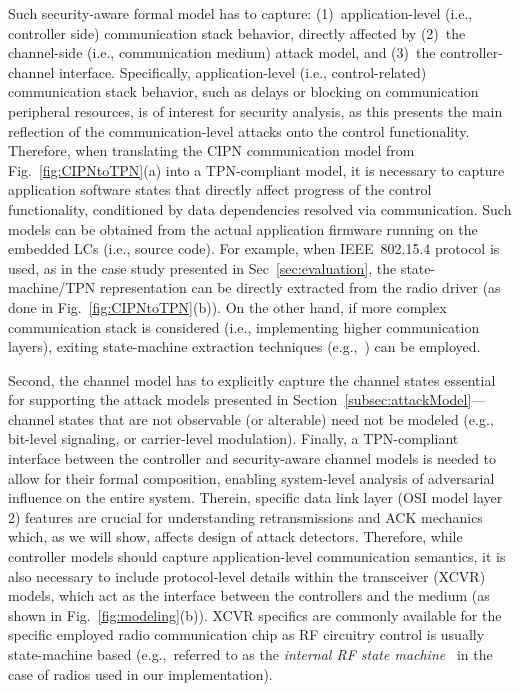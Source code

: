 {
Such security-aware formal model has to capture:
(1)~application-level (i.e., controller side) communication stack behavior, directly affected by
(2)~the channel-side (i.e., communication medium) attack model, and
(3)~the controller-channel interface.
Specifically, application-level (i.e., control-related) communication stack behavior, such as delays or blocking on communication peripheral resources, is of interest for security analysis, as this presents the main reflection of the communication-level attacks onto the control functionality. Therefore, when translating the CIPN communication model from Fig.~\ref{fig:CIPNtoTPN}(a) into a TPN-compliant model, it is necessary to capture application software states that directly affect progress of the control functionality, conditioned by data dependencies resolved via communication. Such models can be obtained from the actual application firmware running on the embedded LCs (i.e., source code). For example, when IEEE~\mbox{802.15.4} protocol is used, as in the case study presented in Sec~\ref{sec:evaluation}, the state-machine/TPN representation can be directly extracted from the radio driver (as done in Fig.~\ref{fig:CIPNtoTPN}(b)).
On the other hand, if more complex communication stack is considered (i.e., implementing higher communication layers), exiting state-machine extraction techniques (e.g.,~\cite{soteria}) can be employed.

Second, the channel model has to explicitly capture the channel states essential for supporting the attack models presented in Section~\ref{subsec:attackModel}---channel states that are not observable (or alterable) need not be modeled (e.g., bit-level signaling, or carrier-level modulation). Finally, a TPN-compliant interface between the controller and security-aware channel models is needed to allow for their formal composition, %
enabling system-level analysis of adversarial influence on the entire system. Therein, specific data link layer (OSI model layer 2) features are crucial for understanding retransmissions and ACK mechanics which, as we will show, affects design of attack detectors. Therefore, while controller models should capture application-level communication semantics, it is also necessary to include protocol-level details within the transceiver (XCVR) models, which act as the interface between the controllers and the medium (as shown in Fig.~\ref{fig:modeling}(b)). XCVR specifics are commonly available for the specific employed radio communication chip as RF circuitry control is usually state-machine based (e.g.,~referred to as the \emph{internal RF state machine}~\cite{mrf} in the case of radios used in our implementation).



}
